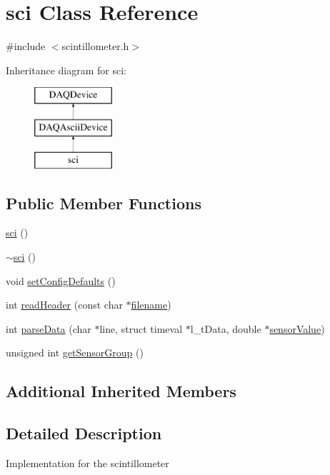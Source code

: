 \hypertarget{classsci}{\section{sci Class Reference}
\label{classsci}
}


{\ttfamily \#include $<$scintillometer.\-h$>$}

Inheritance diagram for sci\-:\begin{figure}[H]
\begin{center}
\leavevmode
\includegraphics[height=3.000000cm]{classsci}
\end{center}
\end{figure}
\subsection*{Public Member Functions}
\begin{DoxyCompactItemize}
\item 
\hyperlink{classsci_a174afce65f9b9189f2deab5b03538065}{sci} ()
\item 
\hyperlink{classsci_a38001383ffb08170088809b0b271f3f7}{$\sim$sci} ()
\item 
void \hyperlink{classsci_a0f0a2b8d161af6f539e202ff5357c56f}{set\-Config\-Defaults} ()
\item 
int \hyperlink{classsci_acf9c29e3fe47d89795dd4160525c008f}{read\-Header} (const char $\ast$\hyperlink{classDAQDevice_a7f9cda7cf5b41f6b134c313477e9644b}{filename})
\item 
int \hyperlink{classsci_abb8bd3f6f3861a95e4977614fd9cea70}{parse\-Data} (char $\ast$line, struct timeval $\ast$l\-\_\-t\-Data, double $\ast$\hyperlink{classDAQDevice_ad148188c57598fdf4fd4c1c333aeb0d8}{sensor\-Value})
\item 
unsigned int \hyperlink{classsci_a54872e325b018dabbd6f60e0443f864c}{get\-Sensor\-Group} ()
\end{DoxyCompactItemize}
\subsection*{Additional Inherited Members}


\subsection{Detailed Description}
Implementation for the scintillometer 


